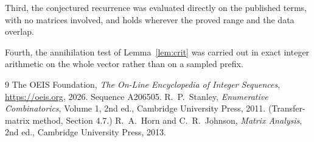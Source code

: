 \documentclass[11pt,a4paper]{article}
\theoremstyle{plain}
\theoremstyle{definition}
\begin{document}
Third, the conjectured recurrence was evaluated directly on the published terms, with no
matrices involved, and holds wherever the proved range and the data overlap.

Fourth, the annihilation test of Lemma~\ref{lem:crit} was carried out in exact integer
arithmetic on the whole vector rather than on a sampled prefix.

\begin{thebibliography}{9}
 The OEIS Foundation, \emph{The On-Line Encyclopedia of Integer
Sequences}, \url{https://oeis.org}, 2026. Sequence A206505.
 R.~P.~Stanley, \emph{Enumerative Combinatorics}, Volume 1, 2nd ed.,
Cambridge University Press, 2011. (Transfer-matrix method, Section 4.7.)
 R.~A.~Horn and C.~R.~Johnson, \emph{Matrix Analysis}, 2nd ed., Cambridge
University Press, 2013.
\end{thebibliography}
\end{document}
